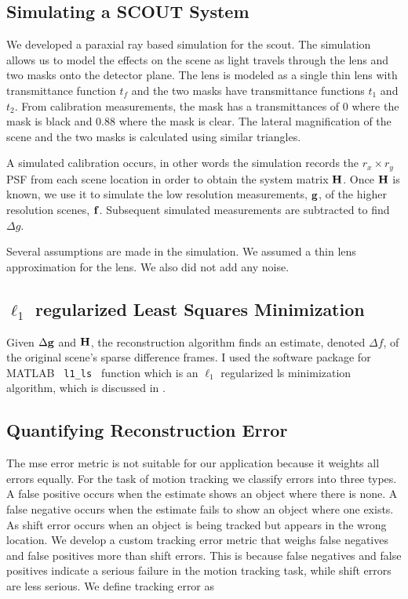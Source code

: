 \subsection{Simulating a SCOUT System}

We developed a paraxial ray based simulation for the \gls{scout}. The simulation allows us to model the effects on the scene as light travels through the lens and two masks onto the detector plane. The lens is modeled as a single thin lens with transmittance function $t_f$ and the two masks have transmittance functions $t_1$ and $t_2$. From calibration measurements, the mask has a transmittances of $0$ where the mask is black and $0.88$ where the mask is clear. The lateral magnification of the scene and the two masks is calculated using similar triangles.

A simulated calibration occurs, in other words the simulation records the $r_x \times r_y$ PSF from each scene location in order to obtain the system matrix $\mathbf{H}$. Once $\mathbf{H}$ is known, we use it to simulate the low resolution measurements, $\mathbf{g}$, of the higher resolution scenes, $\mathbf{f}$. Subsequent simulated measurements are subtracted to find $\Delta g$. 

Several assumptions are made in the simulation. We assumed a thin lens approximation for the lens. We also did not add any noise.


\subsection{ $\ell_1$ regularized Least Squares Minimization}

Given $\Delta \mathbf{g}$ and $ \mathbf{H} $, the reconstruction algorithm finds an estimate, denoted $ \Delta f $, of the original scene’s sparse difference frames. I used the software package for MATLAB \texttt{ l1\_ls } function \cite{kim2007interior} which is an $ \ell_1 $ regularized \gls{ls} minimization algorithm, which is discussed in .  

\subsection{Quantifying Reconstruction Error}

The \gls{mse} error metric is not suitable for our application because it weights all errors equally. For the task of motion tracking we classify errors into three types. A false positive occurs when the estimate shows an object where there is none. A false negative occurs when the estimate fails to show an object where one exists. As shift error occurs when an object is being tracked but appears in the wrong location. We develop a custom tracking error metric that weighs false negatives and false positives more than shift errors. This is because false negatives and false positives indicate a serious failure in the motion tracking task, while shift errors are less serious. We define tracking error as

